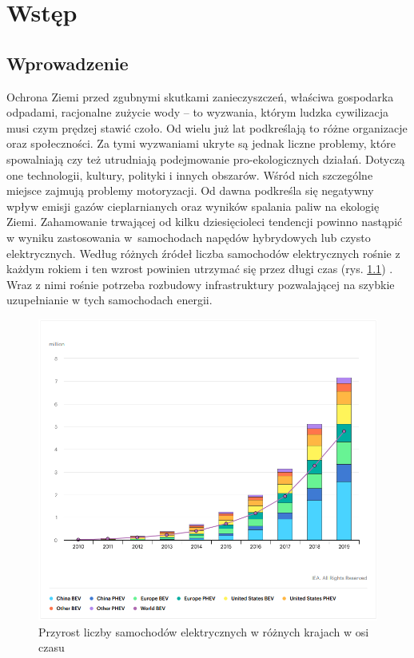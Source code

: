 \chapter{Wstęp}

\section{Wprowadzenie}
Ochrona Ziemi przed zgubnymi skutkami zanieczyszczeń, właściwa gospodarka odpadami, racjonalne zużycie wody -- to wyzwania, którym ludzka cywilizacja musi czym prędzej stawić czoło. Od wielu już lat podkreślają to różne organizacje oraz społeczności. Za tymi wyzwaniami ukryte są jednak liczne problemy, które spowalniają czy też utrudniają podejmowanie pro-ekologicznych działań. Dotyczą one technologii, kultury, polityki i innych obszarów. Wśród nich szczególne miejsce zajmują problemy motoryzacji. Od dawna podkreśla się negatywny wpływ emisji gazów cieplarnianych oraz wyników spalania paliw na ekologię Ziemi. Zahamowanie trwającej od kilku dziesięcioleci tendencji powinno nastąpić w wyniku zastosowania w~samochodach napędów hybrydowych lub czysto elektrycznych. Według różnych źródeł liczba samochodów elektrycznych rośnie z każdym rokiem i ten wzrost powinien utrzymać się przez długi czas (rys. \ref{fig:car_chart}) \cite{iea1,mam1}. Wraz z nimi rośnie potrzeba rozbudowy infrastruktury pozwalającej na szybkie uzupełnianie w tych samochodach energii. 
\begin{figure}[ht]
    \centering
        \includegraphics[width=.65\linewidth]{rys01/chart.png}
        \caption{Przyrost liczby samochodów elektrycznych w różnych krajach w osi czasu \cite{car_chart}}
    \label{fig:car_chart}
\end{figure}

